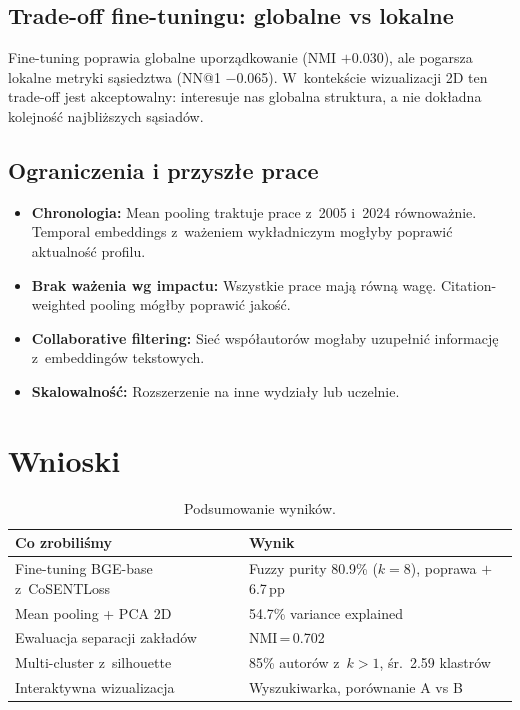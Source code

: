 \documentclass[a4paper,11pt]{article}
\begin{document}
\subsection{Trade-off fine-tuningu: globalne vs lokalne}
Fine-tuning poprawia globalne uporządkowanie (NMI $+$0.030), ale pogarsza lokalne metryki sąsiedztwa (NN@1 $-$0.065).
W~kontekście wizualizacji 2D ten trade-off jest akceptowalny: interesuje nas globalna struktura, a nie dokładna kolejność najbliższych sąsiadów.

\subsection{Ograniczenia i przyszłe prace}

\begin{itemize}[nosep]
  \item \textbf{Chronologia:} Mean pooling traktuje prace z~2005 i~2024 równoważnie. Temporal embeddings z~ważeniem wykładniczym mogłyby poprawić aktualność profilu.
  \item \textbf{Brak ważenia wg impactu:} Wszystkie prace mają równą wagę. Citation-weighted pooling mógłby poprawić jakość.
  \item \textbf{Collaborative filtering:} Sieć współautorów mogłaby uzupełnić informację z~embeddingów tekstowych.
  \item \textbf{Skalowalność:} Rozszerzenie na inne wydziały lub uczelnie.
\end{itemize}


\section{Wnioski}

\begin{table}[H]
\centering
\caption{Podsumowanie wyników.}
\begin{tabular}{lp{7.5cm}}
\toprule
Co zrobiliśmy & Wynik \\
\midrule
Fine-tuning BGE-base z~CoSENTLoss & Fuzzy purity 80.9\% ($k{=}8$), poprawa $+$6.7\,pp \\
Mean pooling + PCA 2D & 54.7\% variance explained \\
Ewaluacja separacji zakładów & NMI\,=\,0.702 \\
Multi-cluster z~silhouette & 85\% autorów z~$k{>}1$, śr.\ 2.59 klastrów \\
Interaktywna wizualizacja & Wyszukiwarka, porównanie A vs B \\
\bottomrule
\end{tabular}
\end{table}
\end{document}
